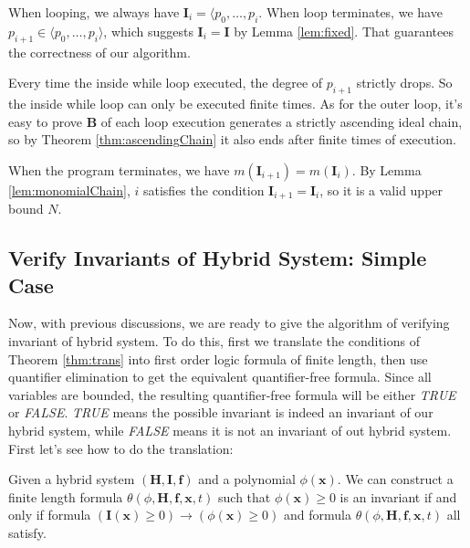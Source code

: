\documentclass{article}
\begin{document}
When looping, we always have $\boldsymbol{I}_i = \langle p_0, \dots, p_i$. When loop terminates, we have $p_{i+1} \in \langle p_0, \dots, p_i \rangle$, which suggests $\boldsymbol{I}_i = \boldsymbol{I}$ by Lemma \ref{lem:fixed}. That guarantees the correctness of our algorithm. 

Every time the inside while loop executed, the degree of $p_{i+1}$ strictly drops. So the inside while loop can only be executed finite times. As for the outer loop, it's easy to prove $\boldsymbol{B}$ of each loop execution generates a strictly ascending ideal chain, so by Theorem \ref{thm:ascendingChain} it also ends after finite times of execution. 

When the program terminates, we have $m(\boldsymbol{I}_{i+1}) = m(\boldsymbol{I}_i)$. By Lemma \ref{lem:monomialChain}, $i$ satisfies the condition $\boldsymbol{I}_{i+1} = \boldsymbol{I}_i$, so it is a valid upper bound $N$.

\subsection{Verify Invariants of Hybrid System: Simple Case}
Now, with previous discussions, we are ready to give the algorithm of verifying invariant of hybrid system. To do this, first we translate the conditions of Theorem \ref{thm:trans} into first order logic formula of finite length, then use quantifier elimination to get the equivalent quantifier-free formula. Since all variables are bounded, the resulting quantifier-free formula will be either \emph{TRUE} or \emph{FALSE}. \emph{TRUE} means the possible invariant is indeed an invariant of our hybrid system, while \emph{FALSE} means it is not an invariant of out hybrid system. First let's see how to do the translation: 

\begin{Theorem}
\label{thm:translate}
Given a hybrid system $(\boldsymbol{H}, \boldsymbol{I}, \boldsymbol{f})$ and a polynomial $\phi(\boldsymbol{x})$. We can construct a finite length formula $\theta(\phi ,\boldsymbol{H}, \boldsymbol{f}, \boldsymbol{x}, t)$ such that $\phi(\boldsymbol{x}) \geq 0$ is an invariant if and only if formula
		$(\boldsymbol{I}(\boldsymbol{x}) \geq 0) \rightarrow (\phi(\boldsymbol{x}) \geq 0)$
and formula
		$\theta(\phi ,\boldsymbol{H}, \boldsymbol{f}, \boldsymbol{x}, t)$
all satisfy.
\end{Theorem}
\end{document}
